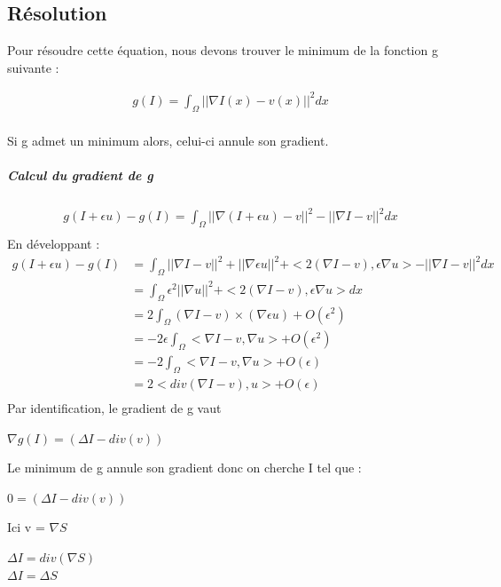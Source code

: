 \subsection{Résolution}
Pour résoudre cette équation, nous devons trouver le minimum de la fonction g suivante  : 
\begin{center}
\begin{equation}
\begin{aligned}
g(I) = \int_\Omega || \nabla I(x) - v(x)||^2 dx\\
\end{aligned}
\end{equation}
\end{center}
Si g admet un minimum alors, celui-ci annule son gradient. 
\subparagraph{Calcul du gradient de g}
\begin{equation*} 
\begin{aligned}
    g(I+\epsilon u) -g(I) =  \int_\Omega || \nabla (I+\epsilon u) - v||^2 - ||\nabla I -v ||^2 dx\\
\end{aligned}
\end{equation*}
En  développant : 
\begin{equation*} 
\left.
\begin{aligned}
    g(I+\epsilon u) -g(I) &=  \int_\Omega || \nabla I - v||^2+ ||\nabla \epsilon u||^2 +<2(\nabla I - v), \epsilon \nabla u>  - ||\nabla I -v ||^2 dx\\
  &=  \int_\Omega \epsilon ^2||\nabla u||^2 +<2(\nabla I - v), \epsilon \nabla u> dx\\
    & = 2\int_\Omega (\nabla I - v) \times (\nabla \epsilon u ) + O (\epsilon^2) \\ 
      &  =   -2\epsilon\int_\Omega <\nabla I - v,  \nabla u> + O (\epsilon^2) \\ 
         &  = -2\int_\Omega<\nabla I - v,  \nabla u > + O (\epsilon)\\ 
    & =  2 <div(\nabla I - v), u > + O (\epsilon)\\
\end{aligned}
\right.
\end{equation*}
Par identification, le gradient de g vaut 
\begin{center}
		$\nabla g(I) = (\Delta I-div( v))$
\end{center} 
Le minimum de g annule son gradient donc on cherche I tel que : 
\begin{center}
		$0= (\Delta I-div( v))$
\end{center}
Ici v = $\nabla S$ 
\begin{center}
		$\Delta I =div(\nabla S)$\\
		$\Delta I = \Delta S$
		
\end{center} 

